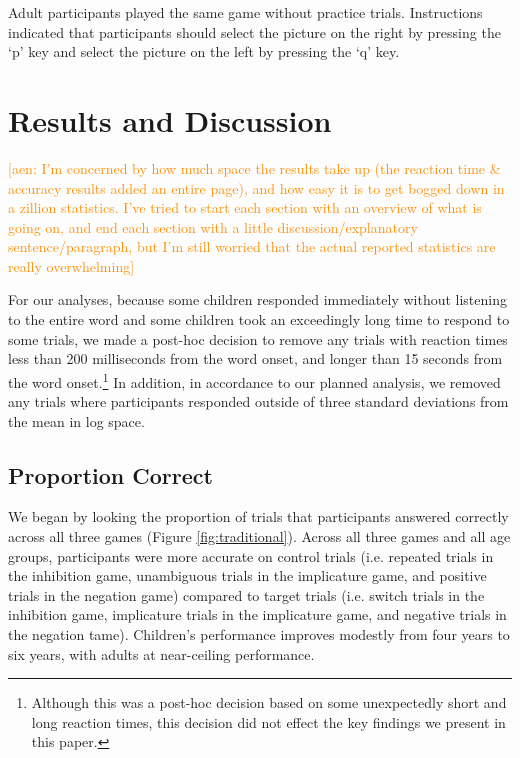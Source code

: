 \documentclass[10pt,letterpaper]{article}
\newcommand{\aen}[1]{\textcolor{DarkOrange}{[aen: #1]}}
\begin{document}
Adult participants played the same game without practice trials.  Instructions indicated that participants should select the picture on the right by pressing the `p' key and select the picture on the left by pressing the `q' key.  

\section{Results and Discussion}

\aen{I'm concerned by how much space the results take up (the reaction time \& accuracy results added an entire page), and how easy it is to get bogged down in a zillion statistics.  I've tried to start each section with an overview of what is going on, and end each section with a little discussion/explanatory sentence/paragraph, but I'm still worried that the actual reported statistics are really overwhelming}

For our analyses, because some children responded immediately without listening to the entire word and some children took an exceedingly long time to respond to some trials, we made a post-hoc decision to remove any trials with reaction times less than 200 milliseconds from the word onset, and longer than 15 seconds from the word onset.\footnote{Although this was a post-hoc decision based on some unexpectedly short and long reaction times, this decision did not effect the key findings we present in this paper.}  In addition, in accordance to our planned analysis, we removed any trials where participants responded outside of three standard deviations from the mean in log space.

\subsection{Proportion Correct}

We began by looking the proportion of trials that participants answered correctly across all three games (Figure \ref{fig:traditional}).  Across all three games and all age groups, participants were more accurate on control trials (i.e. repeated trials in the inhibition game, unambiguous trials in the implicature game, and positive trials in the negation game) compared to target trials (i.e. switch trials in the inhibition game, implicature trials in the implicature game, and negative trials in the negation tame). Children's performance improves modestly from four years to six years, with adults at near-ceiling performance.  
\end{document}
